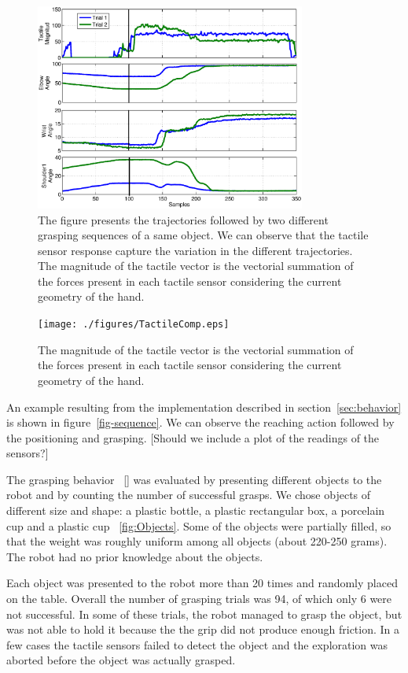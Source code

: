 \begin{figure}[tbp]
\centerline{
\includegraphics[width=3.5in]{./figures/GraspingData1.eps}
}\caption{The figure presents the trajectories followed by two
different grasping sequences of a same object. We can observe that
the tactile sensor response capture the variation in the different
trajectories. The magnitude of the tactile vector is the vectorial
summation of the forces present in each tactile sensor considering
the current geometry of the hand.} \label{fig:AnglesPlot}
\end{figure}

\begin{figure}[tbp]
\centerline{
\texttt{[image: ./figures/TactileComp.eps]}
}\caption{The magnitude of the tactile vector is the vectorial
summation of the forces present in each tactile sensor considering
the current geometry of the hand.} \label{fig:TactileComp}
\end{figure}


An example resulting from the implementation described in
section~\ref{sec:behavior} is shown in figure~\ref{fig-sequence}.
We can observe the reaching action followed by the positioning and
grasping. [Should we include a plot of the readings of the
sensors?]

The grasping behavior ~\ref{} was evaluated by presenting different
objects to the robot and by counting the number of successful grasps.
We chose objects of different size and shape:
a plastic bottle, a plastic rectangular box, a porcelain cup
and a plastic cup ~\ref{fig:Objects}. Some of the objects were partially
filled, so that the weight was roughly uniform among all objects (about 220-250 grams).
The robot had no prior knowledge about the objects.

Each object was presented to the robot more than 20 times and randomly placed
on the table. Overall the number of grasping trials was 94, of which only
6 were not successful. In some of these
trials, the robot managed to grasp the object, but was not able to hold it
because the the grip did not produce enough friction. In a few cases the
tactile sensors failed to detect the object and the exploration was aborted
before the object was actually grasped.

